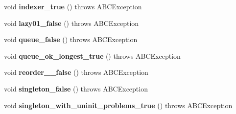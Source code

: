\begin{DoxyCompactItemize}
\item 
\hypertarget{classedu_1_1udel_1_1cis_1_1vsl_1_1civl_1_1transform_1_1PthreadTest_ae930c13364b3e6b1833f2ff97d41bbdc}{}void {\bfseries indexer\+\_\+true} ()  throws A\+B\+C\+Exception \label{classedu_1_1udel_1_1cis_1_1vsl_1_1civl_1_1transform_1_1PthreadTest_ae930c13364b3e6b1833f2ff97d41bbdc}

\item 
\hypertarget{classedu_1_1udel_1_1cis_1_1vsl_1_1civl_1_1transform_1_1PthreadTest_a5b9ef343845b4f23762ab7ff63dc4b8b}{}void {\bfseries lazy01\+\_\+false} ()  throws A\+B\+C\+Exception \label{classedu_1_1udel_1_1cis_1_1vsl_1_1civl_1_1transform_1_1PthreadTest_a5b9ef343845b4f23762ab7ff63dc4b8b}

\item 
\hypertarget{classedu_1_1udel_1_1cis_1_1vsl_1_1civl_1_1transform_1_1PthreadTest_ab8bde17be1bc45b66e93d1f8d40ad9ac}{}void {\bfseries queue\+\_\+false} ()  throws A\+B\+C\+Exception \label{classedu_1_1udel_1_1cis_1_1vsl_1_1civl_1_1transform_1_1PthreadTest_ab8bde17be1bc45b66e93d1f8d40ad9ac}

\item 
\hypertarget{classedu_1_1udel_1_1cis_1_1vsl_1_1civl_1_1transform_1_1PthreadTest_ac68b2e48ef22dcedb7b8d045df6662bd}{}void {\bfseries queue\+\_\+ok\+\_\+longest\+\_\+true} ()  throws A\+B\+C\+Exception \label{classedu_1_1udel_1_1cis_1_1vsl_1_1civl_1_1transform_1_1PthreadTest_ac68b2e48ef22dcedb7b8d045df6662bd}

\item 
\hypertarget{classedu_1_1udel_1_1cis_1_1vsl_1_1civl_1_1transform_1_1PthreadTest_addeee78299ca774de09d856ae5d045d7}{}void {\bfseries reorder\+\_\+\_\+false} ()  throws A\+B\+C\+Exception \label{classedu_1_1udel_1_1cis_1_1vsl_1_1civl_1_1transform_1_1PthreadTest_addeee78299ca774de09d856ae5d045d7}

\item 
\hypertarget{classedu_1_1udel_1_1cis_1_1vsl_1_1civl_1_1transform_1_1PthreadTest_af8dc8942975fd97e374178b7c58a4190}{}void {\bfseries singleton\+\_\+false} ()  throws A\+B\+C\+Exception \label{classedu_1_1udel_1_1cis_1_1vsl_1_1civl_1_1transform_1_1PthreadTest_af8dc8942975fd97e374178b7c58a4190}

\item 
\hypertarget{classedu_1_1udel_1_1cis_1_1vsl_1_1civl_1_1transform_1_1PthreadTest_a660b97745a5c1d3cdb58d025fb2af4c1}{}void {\bfseries singleton\+\_\+with\+\_\+uninit\+\_\+problems\+\_\+true} ()  throws A\+B\+C\+Exception \label{classedu_1_1udel_1_1cis_1_1vsl_1_1civl_1_1transform_1_1PthreadTest_a660b97745a5c1d3cdb58d025fb2af4c1}


\end{DoxyCompactItemize}
